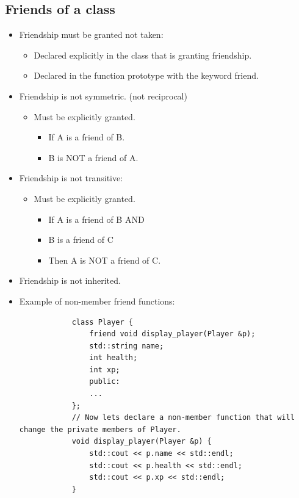 \subsection{Friends of a class}
\begin{itemize}
    \item Friendship must be granted not taken:
        \begin{itemize}
            \item Declared explicitly in the class that is granting friendship.
            \item Declared in the function prototype with the keyword friend.
        \end{itemize}
    
    \item Friendship is not symmetric. (not reciprocal)
        \begin{itemize}
            \item Must be explicitly granted.
                \begin{itemize}
                    \item If A is a friend of B.
                    \item B is NOT a friend of A.
                \end{itemize}
        \end{itemize}
    
    \item Friendship is not transitive:
        \begin{itemize}
            \item Must be explicitly granted.
                \begin{itemize}
                    \item If A is a friend of B AND 
                    \item B is a friend of C 
                    \item Then A is NOT a friend of C.
                \end{itemize}
        \end{itemize}
    
    \item Friendship is not inherited.
    
    \item Example of non-member friend functions:
        \begin{verbatim}
            class Player {
                friend void display_player(Player &p);
                std::string name;
                int health;
                int xp;
                public:
                ...
            };
            // Now lets declare a non-member function that will change the private members of Player.
            void display_player(Player &p) {
                std::cout << p.name << std::endl;
                std::cout << p.health << std::endl;
                std::cout << p.xp << std::endl;
            }
        \end{verbatim}
    

\end{itemize}

